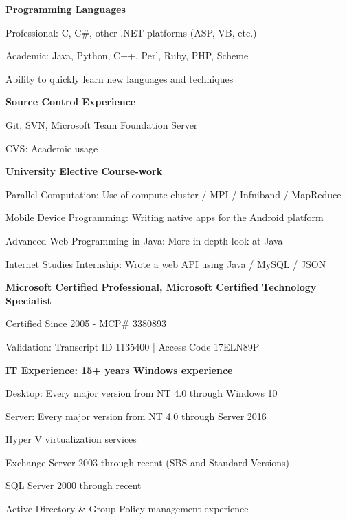 \documentclass[10pt]{article}
\begin{document}
\begin{innerlist}
  \item[] \textbf{Programming Languages}
  \begin{innerlist}
    \item Professional: C, C\#, other .NET platforms (ASP, VB, etc.)
    \item Academic: Java, Python, C++, Perl, Ruby, PHP, Scheme
    \item Ability to quickly learn new languages and techniques
  \end{innerlist}

  \item[] \textbf{Source Control Experience}
  \begin{innerlist}
    \item Git, SVN, Microsoft Team Foundation Server
    \item CVS: Academic usage
  \end{innerlist}
  
  \item[] \textbf{University Elective Course-work}
  \begin{innerlist}
    \item Parallel Computation: Use of compute cluster / MPI / Infniband / MapReduce
    \item Mobile Device Programming: Writing native apps for the Android platform
    \item Advanced Web Programming in Java: More in-depth look at Java
    \item Internet Studies Internship: Wrote a web API using Java / MySQL / JSON
  \end{innerlist}

  \item[] \textbf{Microsoft Certified Professional, Microsoft Certified Technology Specialist}
  \begin{innerlist}
    \item Certified Since 2005 - MCP\# 3380893
    \item Validation: Transcript ID 1135400 | Access Code 17ELN89P
  \end{innerlist}

  \item[] \textbf{IT Experience: 15+ years Windows experience}
  \begin{innerlist}
    \item Desktop: Every major version from NT 4.0 through Windows 10
    \item Server: Every major version from NT 4.0 through Server 2016
    \item Hyper V virtualization services
    \item Exchange Server 2003 through recent (SBS and Standard Versions)
    \item SQL Server 2000 through recent
	\item Active Directory \& Group Policy management experience
  \end{innerlist}


\end{innerlist}
\end{document}
